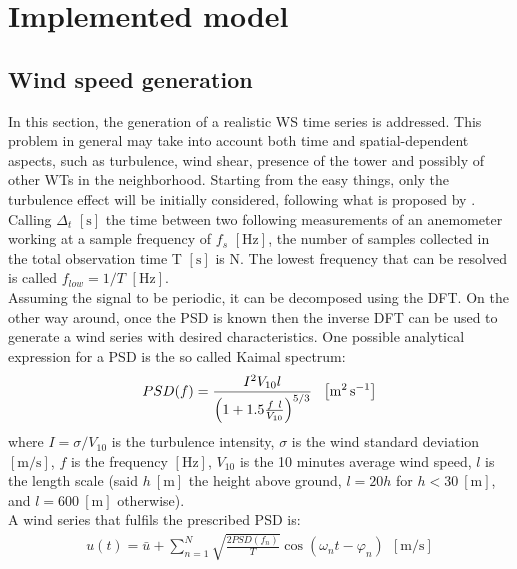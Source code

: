 \newpage
\section{Implemented model}\label{sec:c_basic_model_model}

\subsection{Wind speed generation}
In this section, the generation of a realistic \acrshort{WS} time series is addressed. This problem in general may take into account both time and spatial-dependent aspects, such as turbulence, wind shear, presence of the tower and possibly of other WTs in the neighborhood. Starting from the easy things, only the turbulence effect will be initially considered, following what is proposed by \cite{Aerodynamics_of_wind_turbines}. \\
Calling $\Delta_t$ $\left[\si{\second}\right]$ the time between two following measurements of an anemometer working at a sample frequency of $f_s$ $\left[\si{\hertz}\right]$, the number of samples collected in the total observation time T $\left[\si{\second}\right]$ is N. The lowest frequency that can be resolved is called $f_{low}=1/T$ $\left[\si{\hertz}\right]$. \\
Assuming the signal to be periodic, it can be decomposed using the \acrfull{DFT}. On the other way around, once the \acrfull{PSD} is known then the inverse \acrshort{DFT} can be used to generate a wind series with desired characteristics. One possible analytical expression for a \acrshort{PSD} is the so called Kaimal spectrum:
\begin{equation}
    PSD(f) = \frac{I^2V_{10}l}{\left(1+1.5\frac{f \ l}{V_{10}}\right)^{5/3}} \ \ \mesunt{\square \meter \per \second}
    \label{eq:PSD}
\end{equation}
where $I=\sigma/V_{10}$ is the turbulence intensity, $\sigma$ is the wind standard deviation $\left[\si{\meter\per\second}\right]$, $f$ is the frequency $\left[\si{\hertz}\right]$, $V_{10}$ is the 10 minutes average wind speed, $l$ is the length scale (said $h \ \left[\si{\meter}\right]$ the height above ground, $l=20h$ for $h<30 \ \left[\si{\meter}\right]$, and  $l=600 \ \left[\si{\meter}\right]$ otherwise).\\
A wind series that fulfils the prescribed \acrshort{PSD} is:
\begin{gather}
    u(t) = \bar{u}+\sum_{n=1}^{N}\sqrt{\frac{2PSD(f_n)}{T}}\cos{(\omega_nt-\varphi_n)} \ \ \left[\si{\meter \per \second}\right]
    \label{eq:wind_series}
\end{gather}
